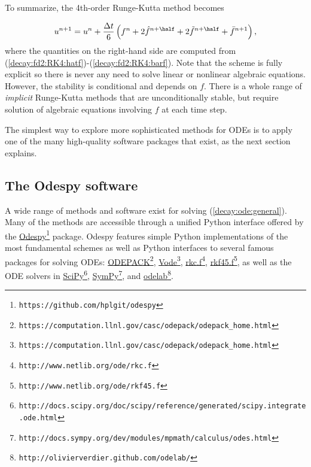 \documentclass[graybox,sectrefs,envcountresetchap,open=right,final]{svmonodo}
\begin{document}
To summarize, the 4th-order Runge-Kutta method becomes

\begin{equation}
u^{n+1} = u^n +
\frac{\Delta t}{6}\left( f^n + 2\hat{f}^{n+\half}
+ 2\tilde{f}^{n+\half} + \bar{f}^{n+1}\right),
\end{equation}
where the quantities on the right-hand side are computed from
(\ref{decay:fd2:RK4:hatf})-(\ref{decay:fd2:RK4:barf}). Note that
the scheme is fully explicit so there is never any need to solve linear or
nonlinear algebraic
equations. However, the stability is conditional and depends on $f$.
There is a whole range of \emph{implicit} Runge-Kutta methods that
are unconditionally stable, but require solution of algebraic
equations involving $f$ at each time step.

The simplest way to explore more sophisticated methods for ODEs is to
apply one of the many high-quality software packages that exist, as the
next section explains.

\subsection{The Odespy software}

A wide range of methods and software exist for solving (\ref{decay:ode:general}).
Many of the methods are accessible through a unified Python interface offered
by the \href{{https://github.com/hplgit/odespy}}{Odespy}\footnote{\texttt{https://github.com/hplgit/odespy}} \cite{odespy} package.
Odespy features simple Python implementations of the most fundamental
schemes as well as Python interfaces to several famous packages for
solving ODEs: \href{{https://computation.llnl.gov/casc/odepack/odepack_home.html}}{ODEPACK}\footnote{\texttt{https://computation.llnl.gov/casc/odepack/odepack\_home.html}}, \href{{https://computation.llnl.gov/casc/odepack/odepack_home.html}}{Vode}\footnote{\texttt{https://computation.llnl.gov/casc/odepack/odepack\_home.html}},
\href{{http://www.netlib.org/ode/rkc.f}}{rkc.f}\footnote{\texttt{http://www.netlib.org/ode/rkc.f}}, \href{{http://www.netlib.org/ode/rkf45.f}}{rkf45.f}\footnote{\texttt{http://www.netlib.org/ode/rkf45.f}}, as well
as the ODE solvers in \href{{http://docs.scipy.org/doc/scipy/reference/generated/scipy.integrate.ode.html}}{SciPy}\footnote{\texttt{http://docs.scipy.org/doc/scipy/reference/generated/scipy.integrate.ode.html}}, \href{{http://docs.sympy.org/dev/modules/mpmath/calculus/odes.html}}{SymPy}\footnote{\texttt{http://docs.sympy.org/dev/modules/mpmath/calculus/odes.html}}, and \href{{http://olivierverdier.github.com/odelab/}}{odelab}\footnote{\texttt{http://olivierverdier.github.com/odelab/}}.
\end{document}
